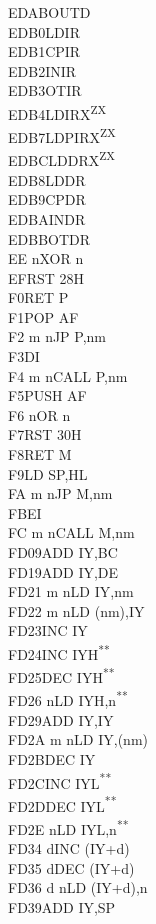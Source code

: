 \documentclass[12pt,twoside,openright,a4paper]{book}
\newcommand{\UNDOC}{\textnormal{\textsuperscript{**}}}
\newcommand{\ZXN}{\textnormal{\textsuperscript{ZX}}}
\begin{document}
\begin{multicols}{3}
{\begin{tabbing}
	EDAB\>OUTD\\
	EDB0\>LDIR\\
	EDB1\>CPIR\\
	EDB2\>INIR\\
	EDB3\>OTIR\\
	EDB4\>LDIRX\ZXN\\
	EDB7\>LDPIRX\ZXN\\
	EDBC\>LDDRX\ZXN\\
	EDB8\>LDDR\\
	EDB9\>CPDR\\
	EDBA\>INDR\\
	EDBB\>OTDR\\
	EE n\>XOR n\\
	EF\>RST 28H\\
	F0\>RET P\\
	F1\>POP AF\\
	F2 m n\>JP P,nm\\
	F3\>DI\\
	F4 m n\>CALL P,nm\\
	F5\>PUSH AF\\
	F6 n\>OR n\\
	F7\>RST 30H\\
	F8\>RET M\\
	F9\>LD SP,HL\\
	FA m n\>JP M,nm\\
	FB\>EI\\
	FC m n\>CALL M,nm\\
	FD09\>ADD IY,BC\\
	FD19\>ADD IY,DE\\
	FD21 m n\>LD IY,nm\\
	FD22 m n\>LD (nm),IY\\
	FD23\>INC IY\\
	FD24\>INC IYH\UNDOC\\
	FD25\>DEC IYH\UNDOC\\
	FD26 n\>LD IYH,n\UNDOC\\
	FD29\>ADD IY,IY\\
	FD2A m n\>LD IY,(nm)\\
	FD2B\>DEC IY\\
	FD2C\>INC IYL\UNDOC\\
	FD2D\>DEC IYL\UNDOC\\
	FD2E n\>LD IYL,n\UNDOC\\
	FD34 d\>INC (IY+d)\\
	FD35 d\>DEC (IY+d)\\
	FD36 d n\>LD (IY+d),n\\
	FD39\>ADD IY,SP\\

\end{tabbing}}
\end{multicols}
\end{document}
